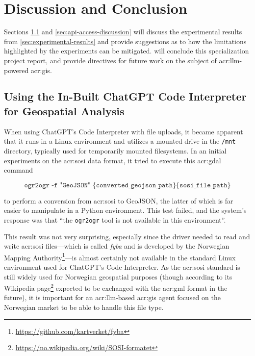 \chapter{Discussion and Conclusion}\label{cha:discussion-and-conclusion}

Sections \ref{sec:code-interpreter-discussion} and \ref{sec:api-access-discussion} will discuss the experimental results from \autoref{sec:experimental-results} and provide suggestions as to how the limitations highlighted by the experiments can be mitigated.  will conclude this specialization project report, and provide directives for future work on the subject of \acrshort{acr:llm}-powered \acrshort{acr:gis}.

\section{Using the In-Built ChatGPT Code Interpreter for Geospatial Analysis}\label{sec:code-interpreter-discussion}

When using ChatGPT's Code Interpreter with file uploads, it became apparent that it runs in a Linux environment and utilizes a mounted drive in the \texttt{/mnt} directory, typically used for temporarily mounted filesystems. In an initial experiments on the \acrshort{acr:sosi} data format, it tried to execute this \acrshort{acr:gdal} command

$$
    \texttt{ogr2ogr -f "GeoJSON" \{converted\_geojson\_path\} \{sosi\_file\_path\}}
$$

\noindent to perform a conversion from \acrshort{acr:sosi} to GeoJSON, the latter of which is far easier to manipulate in a Python environment. This test failed, and the system's response was that \enquote{the \texttt{ogr2ogr} tool is not available in this environment}.

This result was not very surprising, especially since the driver needed to read and write \acrshort{acr:sosi} files---which is called \textit{fyba} and is developed by the Norwegian Mapping Authority\footnote{\url{https://github.com/kartverket/fyba}}---is almost certainly not available in the standard Linux environment used for ChatGPT's Code Interpreter. As the \acrshort{acr:sosi} standard is still widely used for Norwegian geospatial purposes (though according to its Wikipedia page\footnote{\url{https://no.wikipedia.org/wiki/SOSI-formatet}} expected to be exchanged with the \acrshort{acr:gml} format in the future), it is important for an \acrshort{acr:llm}-based \acrshort{acr:gis} agent focused on the Norwegian market to be able to handle this file type.

